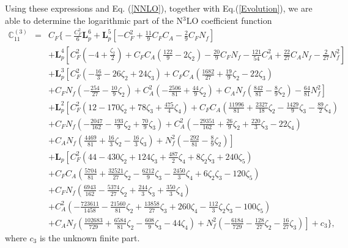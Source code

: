 \documentclass[aps,prl,twocolumn,secnumarabic,notitlepage,superscriptaddress,nofootinbib,tightenlines,floatfix,preprintnumbers]{revtex4-1}
\newcommand{\nn}{\nonumber}
\renewcommand{\(}{\left(}
\renewcommand{\)}{\right)}
\renewcommand{\[}{\left[}
\renewcommand{\]}{\right]}
\begin{document}
\begin{widetext}
Using these expressions and Eq. (\ref{NNLO}), together with Eq.(\ref{Evolution}), we are able to determine the logarithmic part of the N$^3$LO coefficient function 
\begin{eqnarray}\label{NNNLO}
\mathbb{C}_{11}^{(3)}&=&C_F\Bigg\{-\frac{C_F^2}{6}  \mathbf{L}_p^6+\mathbf{L}_p^5\left[-C_F^2+\frac{11}{9}C_F C_A -\frac{2}{9}C_FN_f\right]
\\ \nn &&
+\mathbf{L}_p^4\left[C_F^2\left(-4+\frac{\zeta_2}{2}\right)+C_FC_A \left(\frac{122}{9}-2 \zeta_2\right)-\frac{20}{9}C_FN_f-\frac{121}{54}C_A^2+\frac{22}{27}C_AN_f-\frac{2}{27}N_f^2\right]
\\ \nn &&
+\mathbf{L}_p^3\left[C_F^2\left(-\frac{16}{3}-26 \zeta_2+24 \zeta_3\right) +C_F C_A \left(\frac{1682}{27}+\frac{19 }{9}\zeta_2-22 \zeta_3\right)\right.
\\ \nn &&
\left.+C_F N_f\left(-\frac{254}{27}-\frac{10 }{9}\zeta_2\right)+C_A^2\left(-\frac{2506}{81}+\frac{44 }{9}\zeta_2\right)+C_A N_f\left(\frac{842}{81}-\frac{8 }{9}\zeta_2\right)-\frac{64}{81}N_f^2\right]
\\ \nn &&
+\mathbf{L}_p^2\left[C_F^2\left(12-170 \zeta_2+78 \zeta_3+\frac{475 }{4}\zeta_4\right) +C_FC_A\left(\frac{11996}{81}+\frac{2327}{18}\zeta_2-\frac{1429 }{9}\zeta_3-\frac{89}{2}\zeta_4\right)\right.
\\ \nn &&
\left.+C_F N_f\left(-\frac{2047}{162}-\frac{193 }{9}\zeta_2+\frac{70 }{9}\zeta_3\right)+C_A^2\left(-\frac{29351}{162}+\frac{26}{9}\zeta_2+\frac{220}{3}\zeta_3-22 \zeta_4\right)\right.
\\ \nn &&
\left.+C_A N_f\left(\frac{4469}{81}+\frac{16 }{3}\zeta_2-\frac{16 }{3}\zeta_3\right)+N_f^2\left(-\frac{292}{81}-\frac{8 }{9}\zeta_2\right)\right]
\\ \nn &&
+\mathbf{L}_p\left[C_F^2\left(44-430 \zeta_2+124 \zeta_3+\frac{487 }{2}\zeta_4+8 \zeta_2\zeta_3+240 \zeta_5\right)\right.
\\ \nn &&
\left.+C_F C_A\left(\frac{5704}{81}+\frac{32521}{27}\zeta_2-\frac{6212 }{9}\zeta_3-\frac{2450}{3}\zeta_4+6 \zeta_2\zeta_3-120 \zeta_5\right) \right.
\\ \nn &&
\left.+C_F N_f\left(\frac{6943}{162}-\frac{5374 }{27}\zeta_2+\frac{244 }{3}\zeta_3+\frac{350 }{3}\zeta_4\right)\right.
\\ \nn &&
\left.+C_A^2\left(-\frac{723611}{1458}-\frac{21560}{81} \zeta_2+\frac{13858 }{27}\zeta_3+260 \zeta_4-\frac{112}{3}\zeta_2\zeta_3-100 \zeta_5\right)\right.
\\ \nn &&
\left.+C_A N_f\left(\frac{102683}{729}+\frac{6584}{81}\zeta_2-\frac{608}{9}\zeta_3-44 \zeta_4\right)+N_f^2\left(-\frac{6184}{729}-\frac{128 }{27}\zeta_2-\frac{16 }{27}\zeta_3\right)\right]+
c_3\Bigg\},
\end{eqnarray}
where $c_3$ is the unknown finite part.
\end{widetext}
\end{document}
